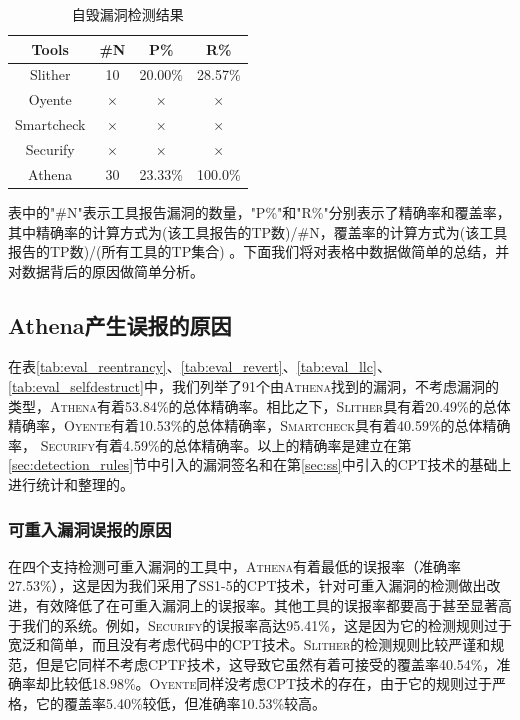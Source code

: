 \begin{table}[htbp]
\begin{minipage}[t]{0.48\textwidth}
  \label{tab:eval_llc}%
  \end{minipage}
  \begin{minipage}[t]{0.48\textwidth}
    \caption{自毁漏洞检测结果}
    \begin{tabular}{cccc}
    \toprule
    Tools & \#N & P\% & R\% \\
    \midrule
    Slither & 10    & 20.00\%    & 28.57\% \\
    Oyente  & $\times$ & $\times$ & $\times$ \\
    Smartcheck  & $\times$ & $\times$ & $\times$ \\
    Securify & $\times$  & $\times$ & $\times$ \\
    Athena & 30    & 23.33\%     & 100.0\% \\
    \bottomrule
    \end{tabular}%
  \label{tab:eval_selfdestruct}%
  \end{minipage}
    \label{tab:eval_all}
\end{table}%

表中的"\#N"表示工具报告漏洞的数量，"P\%"和"R\%"分别表示了精确率和覆盖率，其中精确率的计算方式为(该工具报告的TP数)/\#N，覆盖率的计算方式为(该工具报告的TP数)/(所有工具的TP集合) 。下面我们将对表格中数据做简单的总结，并对数据背后的原因做简单分析。

\subsection{Athena产生误报的原因}

在表\ref{tab:eval_reentrancy}、\ref{tab:eval_revert}、\ref{tab:eval_llc}、\ref{tab:eval_selfdestruct}中，我们列举了91个由\textsc{Athena}找到的漏洞，不考虑漏洞的类型，\textsc{Athena}有着53.84\%的总体精确率。相比之下，\textsc{Slither}具有着20.49\%的总体精确率，\textsc{Oyente}有着10.53\%的总体精确率，\textsc{Smartcheck}具有着40.59\%的总体精确率， \textsc{Securify}有着4.59\%的总体精确率。以上的精确率是建立在第\ref{sec:detection_rules}节中引入的漏洞签名和在第\ref{sec:ss}中引入的CPT技术的基础上进行统计和整理的。

\subsubsection{可重入漏洞误报的原因}

在四个支持检测可重入漏洞的工具中，\textsc{Athena}有着最低的误报率（准确率27.53\%），这是因为我们采用了SS1-5的CPT技术，针对可重入漏洞的检测做出改进，有效降低了在可重入漏洞上的误报率。其他工具的误报率都要高于甚至显著高于我们的系统。例如，\textsc{Securify}的误报率高达95.41\%，这是因为它的检测规则过于宽泛和简单，而且没有考虑代码中的CPT技术。\textsc{Slither}的检测规则比较严谨和规范，但是它同样不考虑CPTF技术，这导致它虽然有着可接受的覆盖率40.54\%，准确率却比较低18.98\%。\textsc{Oyente}同样没考虑CPT技术的存在，由于它的规则过于严格，它的覆盖率5.40\%较低，但准确率10.53\%较高。

